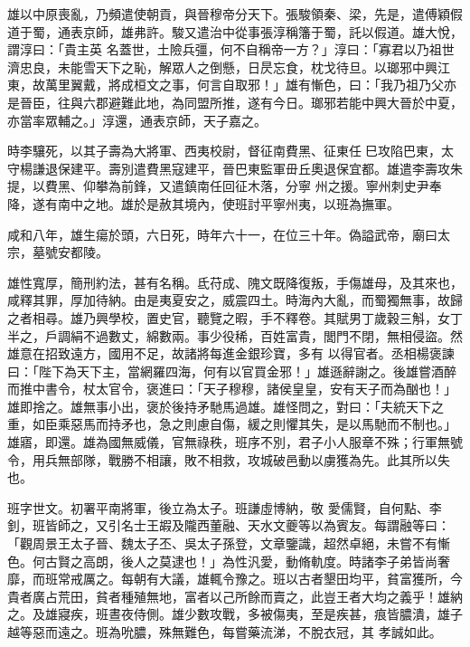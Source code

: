\begin{pinyinscope}
 雄以中原喪亂，乃頻遣使朝貢，與晉穆帝分天下。張駿領秦、梁，先是，遣傅穎假道于蜀，通表京師，雄弗許。駿又遣治中從事張淳稱籓于蜀，託以假道。雄大悅，謂淳曰：「貴主英
 名蓋世，土險兵彊，何不自稱帝一方？」淳曰：「寡君以乃祖世濟忠良，未能雪天下之恥，解眾人之倒懸，日昃忘食，枕戈待旦。以瑯邪中興江東，故萬里翼戴，將成桓文之事，何言自取邪！」雄有慚色，曰：「我乃祖乃父亦是晉臣，往與六郡避難此地，為同盟所推，遂有今日。瑯邪若能中興大晉於中夏，亦當率眾輔之。」淳還，通表京師，天子嘉之。



 時李驤死，以其子壽為大將軍、西夷校尉，督征南費黑、征東任巳攻陷巴東，太守楊謙退保建平。壽別遣費黑寇建平，晉巴東監軍毌丘奧退保宜都。雄遣李壽攻朱提，以費黑、仰攀為前鋒，又遣鎮南任回征木落，分寧
 州之援。寧州刺史尹奉降，遂有南中之地。雄於是赦其境內，使班討平寧州夷，以班為撫軍。



 咸和八年，雄生瘍於頭，六日死，時年六十一，在位三十年。偽謚武帝，廟曰太宗，墓號安都陵。



 雄性寬厚，簡刑約法，甚有名稱。氐苻成、隗文既降復叛，手傷雄母，及其來也，咸釋其罪，厚加待納。由是夷夏安之，威震四土。時海內大亂，而蜀獨無事，故歸之者相尋。雄乃興學校，置史官，聽覽之暇，手不釋卷。其賦男丁歲穀三斛，女丁半之，戶調絹不過數丈，綿數兩。事少役稀，百姓富貴，閭門不閉，無相侵盜。然雄意在招致遠方，國用不足，故諸將每進金銀珍寶，多有
 以得官者。丞相楊褒諫曰：「陛下為天下主，當網羅四海，何有以官買金邪！」雄遜辭謝之。後雄嘗酒醉而推中書令，杖太官令，褒進曰：「天子穆穆，諸侯皇皇，安有天子而為酗也！」雄即捨之。雄無事小出，褒於後持矛馳馬過雄。雄怪問之，對曰：「夫統天下之重，如臣乘惡馬而持矛也，急之則慮自傷，緩之則懼其失，是以馬馳而不制也。」雄寤，即還。雄為國無威儀，官無祿秩，班序不別，君子小人服章不殊；行軍無號令，用兵無部隊，戰勝不相讓，敗不相救，攻城破邑動以虜獲為先。此其所以失也。



 班字世文。初署平南將軍，後立為太子。班謙虛博納，敬
 愛儒賢，自何點、李釗，班皆師之，又引名士王嘏及隴西董融、天水文夔等以為賓友。每謂融等曰：「觀周景王太子晉、魏太子丕、吳太子孫登，文章鑒識，超然卓絕，未嘗不有慚色。何古賢之高朗，後人之莫逮也！」為性汎愛，動脩軌度。時諸李子弟皆尚奢靡，而班常戒厲之。每朝有大議，雄輒令豫之。班以古者墾田均平，貧富獲所，今貴者廣占荒田，貧者種殖無地，富者以己所餘而賣之，此豈王者大均之義乎！雄納之。及雄寢疾，班晝夜侍側。雄少數攻戰，多被傷夷，至是疾甚，痕皆膿潰，雄子越等惡而遠之。班為吮膿，殊無難色，每嘗藥流涕，不脫衣冠，其
 孝誠如此。




\end{pinyinscope}
